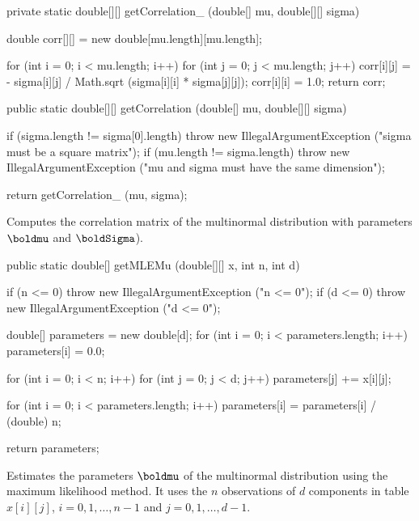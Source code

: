 \begin{code}\begin{hide}

   private static double[][] getCorrelation_ (double[] mu, double[][] sigma) {
      double corr[][] = new double[mu.length][mu.length];

      for (int i = 0; i < mu.length; i++) {
         for (int j = 0; j < mu.length; j++)
            corr[i][j] = - sigma[i][j] / Math.sqrt (sigma[i][i] * sigma[j][j]);
         corr[i][i] = 1.0;
      }
      return corr;
   }\end{hide}

   public static double[][] getCorrelation (double[] mu, double[][] sigma)\begin{hide} {
      if (sigma.length != sigma[0].length)
         throw new IllegalArgumentException ("sigma must be a square matrix");
      if (mu.length != sigma.length)
         throw new IllegalArgumentException ("mu and sigma must have the same dimension");

      return getCorrelation_ (mu, sigma);
   }\end{hide}
\end{code}
\begin{tabb}
   Computes the correlation matrix of the multinormal distribution
   with parameters $\boldmu$ and $\boldSigma$).
\end{tabb}
\begin{code}

   public static double[] getMLEMu (double[][] x, int n, int d)\begin{hide} {
      if (n <= 0)
         throw new IllegalArgumentException ("n <= 0");
      if (d <= 0)
         throw new IllegalArgumentException ("d <= 0");

      double[] parameters = new double[d];
      for (int i = 0; i < parameters.length; i++)
         parameters[i] = 0.0;

      for (int i = 0; i < n; i++)
         for (int j = 0; j < d; j++)
            parameters[j] += x[i][j];

      for (int i = 0; i < parameters.length; i++)
         parameters[i] = parameters[i] / (double) n;

      return parameters;
   }\end{hide}
\end{code}
\begin{tabb}
   Estimates the parameters $\boldmu$ of the multinormal distribution using
   the maximum likelihood method. It uses the $n$ observations of $d$
   components in table $x[i][j]$, $i = 0, 1, \ldots, n-1$ and
   $j = 0, 1, \ldots, d-1$.
\end{tabb}
